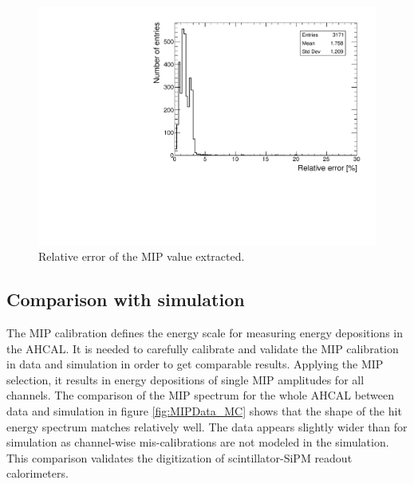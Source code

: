 \begin{figure}[htbp!]
	\centering
	\includegraphics[width=0.6\linewidth]{../Thesis_Plots/EnergyCalib/Plots/RelativeErrorMIP_Combined.pdf}
	\caption{Relative error of the MIP value extracted.} \label{fig:MIPError}
\end{figure}

\subsection{Comparison with simulation}

The MIP calibration defines the energy scale for measuring energy depositions in the AHCAL. It is needed to carefully calibrate and validate the MIP calibration in data and simulation in order to get comparable results. Applying the MIP selection, it results in energy depositions of single MIP amplitudes for all channels. The comparison of the MIP spectrum for the whole AHCAL between data and simulation in figure \ref{fig:MIPData_MC} shows that the shape of the hit energy spectrum matches relatively well. The data appears slightly wider than for simulation as channel-wise mis-calibrations are not modeled in the simulation. This comparison validates the digitization of scintillator-SiPM readout calorimeters.

